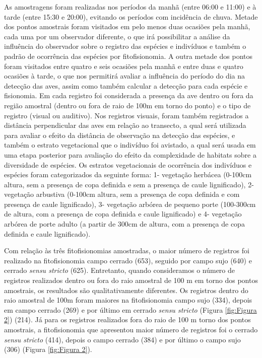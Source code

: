 As amostragens foram realizadas nos períodos da manhã (entre 06:00 e 11:00) e à tarde (entre 15:30 e 20:00), evitando os períodos com incidência de chuva. Metade dos pontos amostrais foram visitados em pelo menos duas ocasiões pela manhã, cada uma por um observador diferente, o que irá possibilitar a análise da influência do observador sobre o registro das espécies e indivíduos e também o padrão de ocorrência das espécies por fitofisionomia. A outra metade dos pontos foram visitados entre quatro e seis ocasiões pela manhã e entre duas e quatro ocasiões à tarde, o que nos permitirá avaliar a influência do período do dia na detecção das aves, assim como também calcular a detecção para cada espécie e fisionomia. Em cada registro foi considerada a presença da ave dentro ou fora da região amostral (dentro ou fora de raio de 100m em torno do ponto) e o tipo de registro (visual ou auditivo). Nos registros visuais, foram também registrados a distância perpendicular das aves em relação ao transecto, a qual será utilizada para avaliar o efeito da distância de observação na detecção das espécies, e também o estrato vegetacional que o indivíduo foi avistado, a qual será usada em uma etapa posterior para avaliação do efeito da complexidade de habitats sobre a diversidade de espécies. Os estratos vegetacionais de ocorrência dos indivíduos e espécies foram categorizados da seguinte forma: 1- vegetação herbácea (0-100cm altura, sem a presença de copa definida e sem a presença de caule lignificado), 2- vegetação arbustiva (0-100cm altura, sem a presença de copa definida e com presença de caule lignificado), 3- vegetação arbórea de pequeno porte (100-300cm de altura, com a presença de copa definida e caule lignificado) e 4- vegetação arbórea de porte adulto (a partir de 300cm de altura, com a presença de copa definida e caule lignificado).

Com relação às três fitofisionomias amostradas, o maior número de registros foi realizado na fitofisionomia campo cerrado (653), seguido por campo sujo (640) e cerrado \textit{sensu stricto} (625). Entretanto, quando consideramos o número de registros realizados dentro ou fora do raio amostral de 100 m em torno dos pontos amostrais, os resultados são qualitativamente diferentes.
Os registros dentro do raio amostral de 100m foram maiores na fitofisionomia campo sujo (334), depois em campo cerrado (269) e por último em cerrado \textit{sensu stricto} (Figura \ref{fig:Figura 2}) (214). Já para os registros realizados fora do raio de 100 m torno dos pontos amostrais, a fitofisionomia que apresentou maior número de registros foi o cerrado \textit{sensu stricto} (414), depois o campo cerrado (384) e por último o campo sujo (306) (Figura \ref{fig:Figura 2}).
